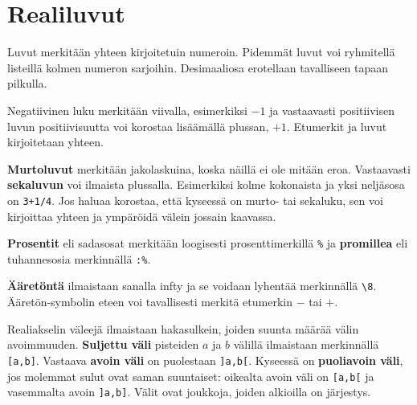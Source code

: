 \section{Realiluvut}
Luvut merkitään yhteen kirjoitetuin numeroin.
Pidemmät luvut voi ryhmitellä listeillä kolmen numeron sarjoihin.
Desimaaliosa erotellaan tavalliseen tapaan pilkulla.

Negatiivinen luku merkitään viivalla, esimerkiksi $-1$ ja vastaavasti positiivisen luvun positiivisuutta voi korostaa lisäämällä plussan, $+1$.
Etumerkit ja luvut kirjoitetaan yhteen.

{\bf Murtoluvut} merkitään jakolaskuina, koska näillä ei ole mitään eroa.
Vastaavasti {\bf sekaluvun} voi ilmaista plussalla. Esimerkiksi kolme kokonaista ja yksi neljäsosa on \verb$3+1/4$.
Jos haluaa korostaa, että kyseessä on murto- tai sekaluku, sen voi kirjoittaa yhteen ja ympäröidä välein jossain kaavassa.

{\bf Prosentit} eli sadasosat merkitään loogisesti prosenttimerkillä \verb$%$ ja {\bf promillea} eli tuhannesosia merkinnällä \verb$:%$.

{\bf Ääretöntä} ilmaistaan sanalla infty ja se voidaan lyhentää merkinnällä \verb$\8$.
Ääretön-symbolin eteen voi tavallisesti merkitä etumerkin $-$ tai $+$.

Realiakselin väleejä ilmaistaan hakasulkein, joiden suunta määrää välin avoimmuuden.
{\bf Suljettu väli} pisteiden $a$ ja $b$ välillä ilmaistaan merkinnällä \verb$[a,b]$.
Vastaava {\bf avoin väli} on puolestaan \verb$]a,b[$.
Kyseessä on {\bf puoliavoin väli}, jos molemmat sulut ovat saman suuntaiset: 
oikealta avoin väli on \verb$[a,b[$ ja vasemmalta avoin \verb$]a,b]$.
Välit ovat joukkoja, joiden alkioilla on järjestys.


